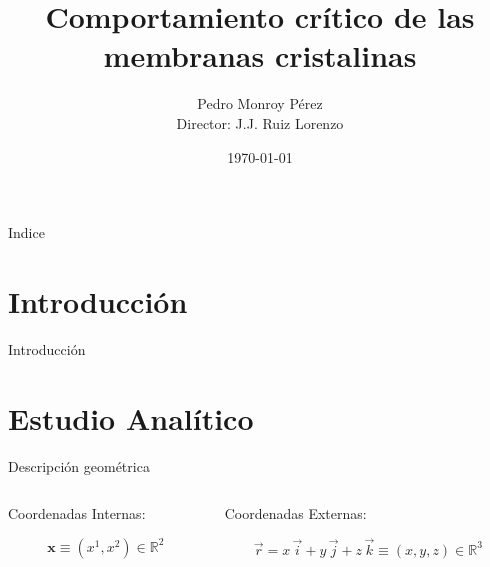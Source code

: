 \documentclass[xcolor=dvipsnames]{beamer}
\title[C. crítico de las membranas cristalinas]{Comportamiento crítico de las membranas cristalinas}
\author[P. Monroy Dir.: Juan J.Ruiz Lorenzo]{Pedro Monroy Pérez \\ Director:
  J.J. Ruiz Lorenzo}
\date{\today}
\institute[UEx]{Dep. de Física, Facultad de Ciencias, Universidad de Extremadura}
\begin{document}
\decimalpoint
\begin{frame}[plain]{}
\titlepage
\end{frame}


\begin{frame}{Indice}
  \tableofcontents[hideallsubsections]
\end{frame}
\section{Introducción}
\begin{frame}{Introducción}

\end{frame}
\section{Estudio Analítico}

\begin{frame}{Descripción geométrica}
  \begin{columns}
    \begin{column}{5.8cm}
      \centering
      Coordenadas Internas:
      \begin{figure}[h]
        \resizebox{\columnwidth}{!}{}
      \end{figure}
      \begin{equation*}
        \mathbf{x}\equiv (x^1,x^2)\in \mathbb{R}^2
      \end{equation*}
    \end{column}
    \begin{column}{5.8cm}
      \centering
      Coordenadas Externas:
      \begin{figure}[h]
        \resizebox{\columnwidth}{!}{}
      \end{figure}
      \begin{equation*}
        \vec{r}=x\,\vec{i}+y\,\vec{j}+z\,\vec{k}\equiv (x,y,z)\in \mathbb{R}^3
      \end{equation*}
    \end{column}
  \end{columns}
\end{frame}
\end{document}
